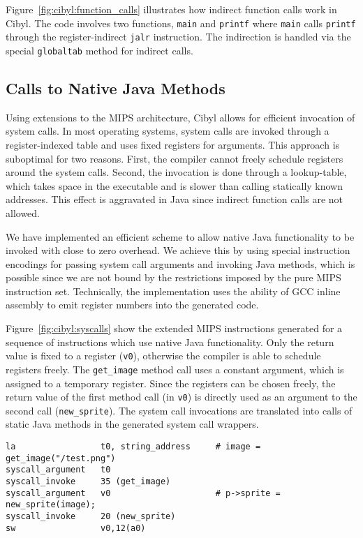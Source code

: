 Figure~\ref{fig:cibyl:function_calls} illustrates how indirect function calls
work in Cibyl. The code involves two functions, \texttt{main} and
\texttt{printf} where \texttt{main} calls \texttt{printf} through the
register-indirect \texttt{jalr} instruction. The indirection is handled via
the special \texttt{globaltab} method for indirect calls.

\subsection{Calls to Native Java Methods}
\label{sec:cibyl:native_java}
Using extensions to the MIPS architecture, Cibyl allows for efficient
invocation of system calls. In most operating systems, system calls are
invoked through a register-indexed table and uses fixed registers for arguments.
This approach is suboptimal for two reasons.  First, the compiler cannot
freely schedule registers around the system calls. Second, the invocation is
done through a lookup-table, which takes space in the executable and is slower
than calling statically known addresses. This effect is aggravated in Java
since indirect function calls are not allowed.

We have implemented an efficient scheme to allow native Java functionality to
be invoked with close to zero overhead.  We achieve this by using special
instruction encodings for passing system call arguments and invoking Java
methods, which is possible since we are not bound by the restrictions imposed
by the pure MIPS instruction set. Technically, the implementation uses the
ability of GCC inline assembly to emit register numbers into the generated
code.

Figure~\ref{fig:cibyl:syscalls} show the extended MIPS instructions generated
for a sequence of instructions which use native Java functionality.  Only the
return value is fixed to a register (\texttt{v0}), otherwise the compiler is
able to schedule registers freely. The \texttt{get\_image} method call uses a
constant argument, which is assigned to a temporary register. Since the
registers can be chosen freely, the return value of the first method call (in
\texttt{v0}) is directly used as an argument to the second call
(\texttt{new\_sprite}). The system call invocations are translated into calls
of static Java methods in the generated system call wrappers.

\begin{figure*}[htb]
  \begin{center}
    \footnotesize
\begin{verbatim}
la                 t0, string_address     # image = get_image("/test.png")
syscall_argument   t0
syscall_invoke     35 (get_image)
syscall_argument   v0                     # p->sprite = new_sprite(image);
syscall_invoke     20 (new_sprite)
sw                 v0,12(a0)
\end{verbatim}
  \end{center}
  \caption{System call handling in Cibyl}
  \label{fig:cibyl:syscalls}
\end{figure*}

